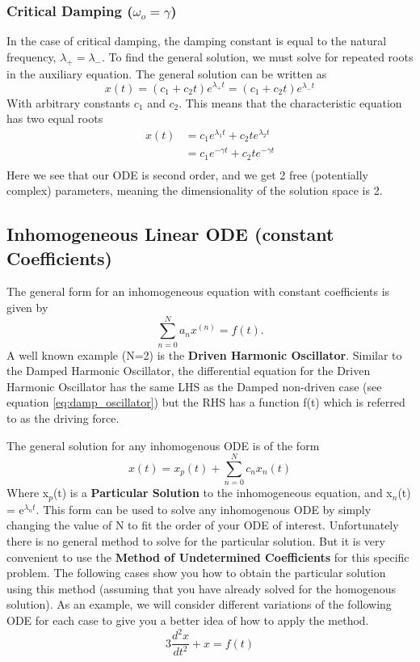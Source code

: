 \documentclass{article}
\newcommand{\be}{\begin{equation}}
\newcommand{\ee}{\end{equation}}
\begin{document}
\subsubsection*{Critical Damping ($\omega_o = \gamma$)}
In the case of critical damping, the damping constant is equal to the natural frequency, $\lambda_+ = \lambda_-$.
To find the general solution, we must solve for repeated roots in the auxiliary equation.
The general solution can be written as
\be
x(t) = (c_1 + c_2t)e^{\lambda_+ t} = (c_1 + c_2t)e^{\lambda_- t}
\ee
With arbitrary constants $c_1$ and $c_2$.
This means that the characteristic equation has two equal roots 
\be
\begin{split}
x(t) &= c_1 e^{\lambda_1 t} + c_2 te^{\lambda_2 t}\\
&= c_1 e^{-\gamma t} + c_2 te^{-\gamma t}\\
\end{split}
\ee
Here we see that our ODE is second order, and we get 2 free (potentially complex) parameters, meaning the dimensionality of the solution space is 2.

\subsection*{Inhomogeneous Linear ODE (constant Coefficients)}
The general form for an inhomogeneous equation with constant coefficients is given by
\be \label{eq:und_coeff_ex}
	\sum_{n=0}^N a_n x^{(n)} = f(t) .
\ee
A well known example (N=2) is the \textbf{Driven Harmonic Oscillator}.
Similar to the Damped Harmonic Oscillator, the differential equation for the Driven Harmonic Oscillator has the same LHS as the Damped non-driven case (see equation \ref{eq:damp_oscillator}) but the RHS has a function f(t) which is referred to as the driving force.

The general solution for any inhomogenous ODE is of the form
\be
x(t) = x_p(t) + \sum_{n=0}^N c_nx_n(t)
\ee
Where x$_p$(t) is a \textbf{Particular Solution} to the inhomogeneous equation, and x$_n$(t) = e$^{\lambda_n t}$.
This form can be used to solve any inhomogenous ODE by simply changing the value of N to fit the order of your ODE of interest.
Unfortunately there is no general method to solve for the particular solution.
But it is very convenient to use the \textbf{Method of Undetermined Coefficients} for this specific problem.
The following cases show you how to obtain the particular solution using this method (assuming that you have already solved for the homogenous solution).
As an example, we will consider different variations of the following ODE for each case to give you a better idea of how to apply the method.
\be
3 \frac{d^2 x}{dt^2} + x = f(t)
\ee
\end{document}
